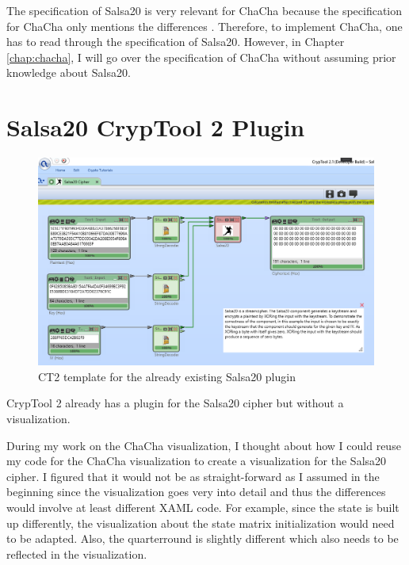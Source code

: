 The specification of Salsa20 is very relevant for ChaCha because the specification for ChaCha only mentions the differences \cite{chachaspec}. Therefore, to implement ChaCha, one has to read through the specification of Salsa20.  However, in Chapter \ref{chap:chacha}, I will go over the specification of ChaCha without assuming prior knowledge about Salsa20.


\section{Salsa20 CrypTool 2 Plugin}
\label{sec:salsaCT2Plugin}

\begin{figure}
\label{fig:salsa.template}
\centering
\includegraphics[width=\textwidth]{figures/ct2/salsa-crop.png}
\caption[Salsa20 CT2 template]{CT2 template for the already existing Salsa20 plugin}
\end{figure}

CrypTool 2 already has a plugin for the Salsa20 cipher but without a visualization.

During my work on the ChaCha visualization, I thought about how I could reuse my code for the ChaCha visualization to create a visualization for the Salsa20 cipher. I figured that it would not be as straight-forward as I assumed in the beginning since the visualization goes very into detail and thus the differences would involve at least different XAML code. For example, since the state is built up differently, the visualization about the state matrix initialization would need to be adapted. Also, the quarterround is slightly different which also needs to be reflected in the visualization. 

